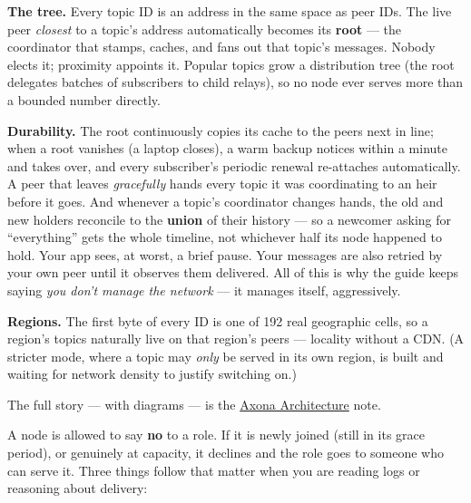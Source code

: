\documentclass[
  nobib]{tufte-handout}
\renewcommand{\subsubsection}[1]{\medskip\par\noindent{\normalsize\bfseries #1}\par\nobreak\smallskip}
\begin{document}
\textbf{The tree.} Every topic ID is an address in the same space as
peer IDs. The live peer \emph{closest} to a topic's address
automatically becomes its \textbf{root} --- the coordinator that stamps,
caches, and fans out that topic's messages. Nobody elects it; proximity
appoints it. Popular topics grow a distribution tree (the root delegates
batches of subscribers to child relays), so no node ever serves more
than a bounded number directly.

\textbf{Durability.} The root continuously copies its cache to the peers
next in line; when a root vanishes (a laptop closes), a warm backup
notices within a minute and takes over, and every subscriber's periodic
renewal re-attaches automatically. A peer that leaves \emph{gracefully}
hands every topic it was coordinating to an heir before it goes. And
whenever a topic's coordinator changes hands, the old and new holders
reconcile to the \textbf{union} of their history --- so a newcomer
asking for ``everything'' gets the whole timeline, not whichever half
its node happened to hold. Your app sees, at worst, a brief pause. Your
messages are also retried by your own peer until it observes them
delivered. All of this is why the guide keeps saying \emph{you don't
manage the network} --- it manages itself, aggressively.

\textbf{Regions.} The first byte of every ID is one of 192 real
geographic cells, so a region's topics naturally live on that region's
peers --- locality without a CDN. (A stricter mode, where a topic may
\emph{only} be served in its own region, is built and waiting for
network density to justify switching on.)

The full story --- with diagrams --- is the
\href{../architecture/Axona-Architecture.tex}{Axona Architecture} note.

\subsubsection{Nodes can refuse work (kernel
4.46.0+)}\label{nodes-can-refuse-work-kernel-4.46.0}

A node is allowed to say \textbf{no} to a role. If it is newly joined
(still in its grace period), or genuinely at capacity, it declines and
the role goes to someone who can serve it. Three things follow that
matter when you are reading logs or reasoning about delivery:
\end{document}
